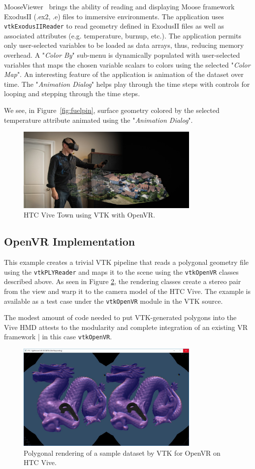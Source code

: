 MooseViewer~\cite{MooseViewer} brings the ability of reading and displaying Moose framework~\cite{Gaston:2015, MooseFramework} ExodusII (.ex2, .e) files to immersive environments. The application uses \texttt{vtkExodusIIReader} to read geometry defined in ExodusII files as well as associated attributes (e.g. temperature, burnup, etc.). The application permits only user-selected variables to be loaded as data arrays, thus, reducing memory overhead. A "\textit{Color By}" sub-menu is dynamically populated with user-selected variables that maps the chosen variable scalars to colors using the selected "\textit{Color Map}".
An interesting feature of the application is animation of the dataset over time.
The "\textit{Animation Dialog}" helps play through the time steps with controls for looping and stepping through the time steps.

We see, in Figure~\ref{fig:fuelpin}, surface geometry colored by the selected temperature attribute animated using the "\textit{Animation Dialog}".

\begin{figure}[h!]
  \centering
  \includegraphics[width=3.5in]{images/ViveTownData.png}
  \caption{HTC Vive Town using VTK with OpenVR.}
  \label{fig:ViveTown}
\end{figure}

\subsection{OpenVR Implementation}

This example creates a trivial VTK pipeline that reads a polygonal geometry file
using the \texttt{vtkPLYReader} and maps it to the scene using the \texttt{vtkOpenVR}
classes described above. As seen in Figure \ref{fig:openvrdragon}, the rendering
classes create a stereo pair from the view and warp it to the camera model of
the HTC Vive. 
The example is available as a test case under the
\texttt{vtkOpenVR} module in the VTK source.

The modest amount of code needed to put VTK-generated polygons into the
Vive HMD attests to the modularity and complete integration of an
existing VR framework | in this case \texttt{vtkOpenVR}.

\begin{figure}[h!]
  \centering
  \includegraphics[width=3.5in]{images/Dragon.jpg}
  \caption{Polygonal rendering of a sample dataset by VTK for OpenVR on HTC Vive.}
  \label{fig:openvrdragon}
\end{figure}